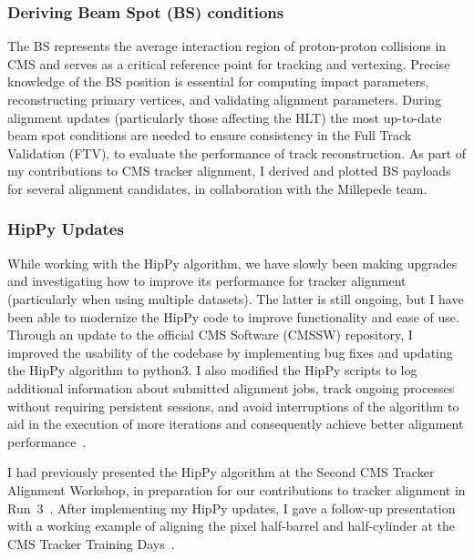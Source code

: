 \subsubsection{Deriving Beam Spot (BS) conditions}

The BS represents the average interaction region of proton-proton collisions in CMS and serves as a critical reference point for tracking and vertexing. Precise knowledge of the BS position is essential for computing impact parameters, reconstructing primary vertices, and validating alignment parameters. During alignment updates (particularly those affecting the HLT) the most up-to-date beam spot conditions are needed to ensure consistency in the Full Track Validation (FTV), to evaluate the performance of track reconstruction. As part of my contributions to CMS tracker alignment, I derived and plotted BS payloads for several alignment candidates, in collaboration with the Millepede team.

\subsubsection{HipPy Updates}

While working with the HipPy algorithm, we have slowly been making upgrades and investigating how to improve its performance for tracker alignment (particularly when using multiple datasets). The latter is still ongoing, but I have been able to modernize the HipPy code to improve functionality and ease of use. Through an update to the official CMS Software (CMSSW) repository, I improved the usability of the codebase by implementing bug fixes and updating the HipPy algorithm to python3. I also modified the HipPy scripts to log additional information about submitted alignment jobs, track ongoing processes without requiring persistent sessions, and avoid interruptions of the algorithm to aid in the execution of more iterations and consequently achieve better alignment performance~\cite{WeeklyTr41:online}. 

I had previously presented the HipPy algorithm at the Second CMS Tracker Alignment Workshop, in preparation for our contributions to tracker alignment in Run~3~\cite{CMSTrack15:online}. After implementing my HipPy updates, I gave a follow-up presentation with a working example of aligning the pixel half-barrel and half-cylinder at the CMS Tracker Training Days~\cite{TrackerT67:online}.

